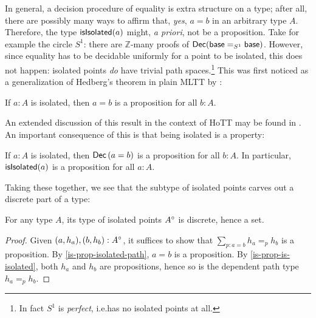 In general, a decision procedure of equality is extra structure on a type;
after all, there are possibly many ways to affirm that, \emph{yes}, \( a = b \) in an arbitrary type \( A \).
Therefore, the type \( \operatorname{\mathsf{isIsolated}}(a) \) might, \emph{a priori}, not be a proposition.
Take for example the circle \( S^1 \): there are \( \mathbb{Z} \)-many proofs of \( \mathsf{Dec}(\mathsf{base} =_{S^1} \mathsf{base}) \).
However, since equality has to be decidable uniformly for a point to be isolated, this does not happen:
isolated points \emph{do} have trivial path spaces.\footnote{In fact \( S^1 \) is \emph{perfect}, i.e.\@ has no isolated points at all.}
This was first noticed as a generalization of Hedberg's theorem in plain \textsc{MLTT} by \citeauthor{Palmgren2011Proofrelevancefamilies}:
\begin{lemma}[note={{\cite[Theorem~6.2]{Palmgren2011Proofrelevancefamilies}}}]\label{is-prop-isolated-path}
  If \( a : A \) is isolated, then \( a = b \) is a proposition for all \( b : A \).
\end{lemma}
An extended discussion of this result in the context of HoTT may be found in \cite[\S~3.1]{Kraus2015TruncationLevelsHomotopy}.
An important consequence of this is that being isolated is a property:
\begin{corollary}\label{is-prop-isolated-dec-path}\label{is-prop-is-isolated}
  If \( a : A \) is isolated, then \( \operatorname{\mathsf{Dec}}{(a = b)} \) is a proposition for all \( b : A \).
  In particular, \( \operatorname{\mathsf{isIsolated}}(a) \) is a proposition for all \( a : A \).
\end{corollary}
Taking these together, we see that the subtype of isolated points carves out a discrete part of a type:
\begin{proposition}[note={Isolated points form a set}]\label{is-set-isolated}
  For any type \( A \), its type of isolated points \( A^{\circ} \) is discrete, hence a set.
  \begin{proof}
    Given \( (a, h_a), (b , h_b) : A^{\circ} \), it suffices to show that
    \( \sum_{p : a = b} h_a =_{p} h_b \) is a proposition.
    By \autoref{is-prop-isolated-path}, \( a = b \) is a proposition.
    By \autoref{is-prop-is-isolated}, both \( h_a \) and \( h_b \) are propositions,
    hence so is the dependent path type \( h_a =_{p} h_b \).
  \end{proof}
\end{proposition}

